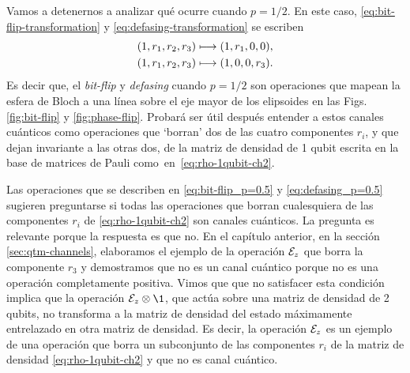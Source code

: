 Vamos a detenernos a analizar qué ocurre cuando $p=1/2$. 
En este caso, \eqref{eq:bit-flip-transformation} y
\eqref{eq:defasing-transformation} se escriben
\begin{align}\label{eq:bit-flip_p=0.5}
\qty(1,r_1,r_2,r_3)&\longmapsto \qty(1,r_1,0,0),\\
\qty(1,r_1,r_2,r_3)&\longmapsto \qty(1,0,0,r_3).\label{eq:defasing_p=0.5}
\end{align}
Es decir que, el \textit{bit-flip} y \textit{defasing} cuando $p=1/2$
son operaciones que mapean la esfera de Bloch a una línea sobre 
el eje mayor de los elipsoides en las Figs. \ref{fig:bit-flip} y \ref{fig:phase-flip}.
Probará ser útil después entender a estos canales cuánticos 
como operaciones que `borran' dos de las cuatro 
componentes $r_i$, y que dejan invariante a las otras dos, 
de la matriz de densidad de 1 qubit escrita en la base de matrices 
de Pauli como~en~\eqref{eq:rho-1qubit-ch2}. 


Las operaciones 	que se describen en \eqref{eq:bit-flip_p=0.5}
y \eqref{eq:defasing_p=0.5} sugieren preguntarse si todas las
operaciones que borran cualesquiera de las componentes $r_i$ 
de \eqref{eq:rho-1qubit-ch2} son canales cuánticos.
La pregunta es relevante porque la respuesta es
que no. En el capítulo anterior, en la sección 
\ref{sec:qtm-channels}, elaboramos el ejemplo de la operación $\mathcal{E}_z$
que borra la componente $r_3$ y demostramos que no es un canal 
cuántico porque no es una operación completamente positiva. 
Vimos que que no satisfacer esta condición implica que la operación 
$\E_z\ot\1$, que actúa sobre una matriz de densidad de 2 qubits,
no transforma a la matriz 
de densidad del estado máximamente entrelazado en otra 
matriz de densidad.
Es decir, la operación $\mathcal{E}_z$ es un ejemplo de una 
operación que borra un subconjunto de las componentes $r_i$ de 
la matriz de densidad \eqref{eq:rho-1qubit-ch2} y que no es canal cuántico.

